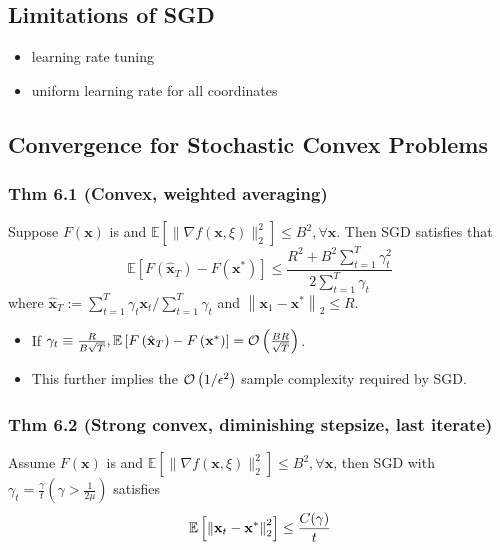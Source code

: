 \subsection*{Limitations of SGD}
\begin{itemize}[leftmargin=*]
    \item learning rate tuning
    \item uniform learning rate for all coordinates
\end{itemize}







\subsection*{Convergence for Stochastic Convex Problems}
\subsubsection*{Thm 6.1 (Convex, weighted averaging)}
Suppose $F(\mathbf{x})$ is  and $\mathbb{E}\left[\|\nabla f(\mathbf{x}, \xi)\|_{2}^{2}\right] \leq B^{2}, \forall \mathbf{x}$. Then SGD satisfies that
$$
\mathbb{E}\left[F\left(\hat{\mathbf{x}}_{T}\right)-F\left(\mathbf{x}^{*}\right)\right] \leq \frac{R^{2}+B^{2} \sum_{t=1}^{T} \gamma_{t}^{2}}{2 \sum_{t=1}^{T} \gamma_{t}}
$$
where $\hat{\mathbf{x}}_{T}:=\sum_{t=1}^{T} \gamma_{t} \mathbf{x}_{t} / \sum_{t=1}^{T} \gamma_{t}$ and $\left\|\mathbf{x}_{1}-\mathbf{x}^{*}\right\|_{2} \leq R$.

\begin{itemize}[leftmargin=*]
    \item If $\gamma_{t} \equiv \frac{R}{B \sqrt{T}}, \mathbb{E}\left[F\left(\hat{\mathbf{x}}_{T}\right)-F\left(\mathbf{x}^{*}\right)\right]=\operatorname{\mathcal{O}} \left(\frac{B R}{\sqrt{T}}\right)$.
    \item This further implies the $\operatorname{\mathcal{O}}\left(1 / \epsilon^{2}\right)$ sample complexity required by SGD.
\end{itemize}

\subsubsection*{Thm 6.2 (Strong convex, diminishing stepsize, last iterate)}
Assume $F(\mathbf{x})$ is  and $\mathbb{E}\left[\|\nabla f(\mathbf{x}, \xi)\|_{2}^{2}\right] \leq B^{2}, \forall \mathbf{x}$, then SGD with $\gamma_{t}=\frac{\gamma}{t}\left(\gamma>\frac{1}{2 \mu}\right)$ satisfies
$$
\mathbb{E}\left[\left\|\mathbf{x}_{t}-\mathbf{x}^{*}\right\|_{2}^{2}\right] \leq \frac{C(\gamma)}{t} \\
$$

